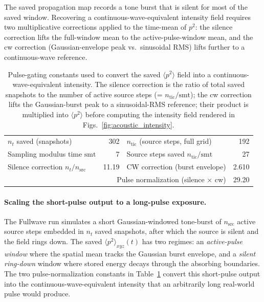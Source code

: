 \documentclass[11pt,letterpaper]{article}
\begin{document}
The saved propagation map records a tone burst that is silent for most
of the saved window.  Recovering a continuous-wave-equivalent intensity
field requires two multiplicative corrections applied to the time-mean
of $p^2$: the silence correction lifts the full-window mean to the
active-pulse-window mean, and the cw correction (Gaussian-envelope
peak vs.\ sinusoidal RMS) lifts further to a continuous-wave reference.

\begin{table}[h!]
\centering
\scriptsize
\setlength{\tabcolsep}{6pt}
\begin{tabular}{lr|lr}
\toprule
$n_t$ saved (snapshots)            & 302                          & $n_{\mathrm{tic}}$ (source steps, full grid) & 192 \\
Sampling modulus time $\mathrm{smt}$ & 7          & Source steps saved $n_{\mathrm{tic}}/\mathrm{smt}$ & 27 \\
Silence correction $n_t / n_{\mathrm{src}}$ & 11.19 & CW correction (burst envelope) & 2.610 \\
\multicolumn{3}{r}{Pulse normalization (silence $\times$ cw)} & 29.20 \\
\bottomrule
\end{tabular}
\caption{Pulse-gating constants used to convert the saved $\langle p^2 \rangle$ field into a continuous-wave-equivalent intensity. The silence correction is the ratio of total saved snapshots to the number of active source steps (= $n_{\mathrm{tic}} / \mathrm{smt}$); the cw correction lifts the Gaussian-burst peak to a sinusoidal-RMS reference; their product is multiplied into $\langle p^2 \rangle$ before computing the intensity field rendered in Figs.~\ref{fig:acoustic_intensity}.}
\label{tab:pulse_norm}
\end{table}

\paragraph{Scaling the short-pulse output to a long-pulse exposure.}
The Fullwave run simulates a short Gaussian-windowed tone-burst of $n_{\mathrm{src}}$ active source steps embedded in $n_t$ saved snapshots, after which the source is silent and the field rings down.  The saved $\langle p^2 \rangle_{xyz}(t)$ has two regimes: an \emph{active-pulse window} where the spatial mean tracks the Gaussian burst envelope, and a \emph{silent ring-down} window where stored energy decays through the absorbing boundaries.  The two pulse-normalization constants in Table~\ref{tab:pulse_norm} convert this short-pulse output into the continuous-wave-equivalent intensity that an arbitrarily long real-world pulse would produce.
\end{document}
